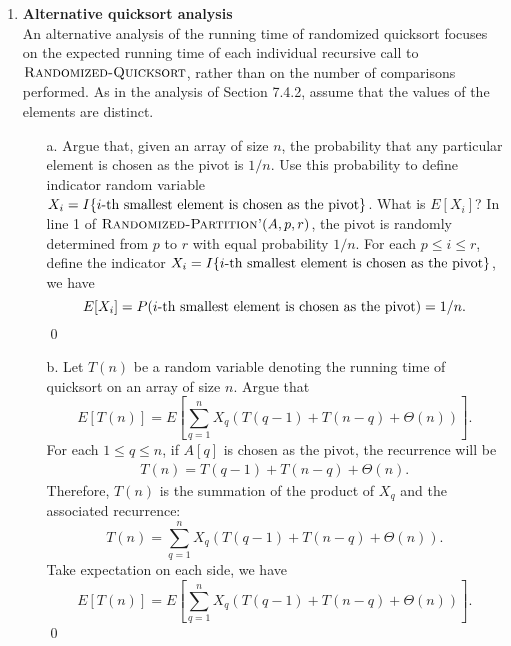 \documentclass[12pt,reqno]{amsart}
\newif\ifanswer
\begin{document}
\begin{enumerate}[1.]
\item \textbf{Alternative quicksort analysis}\\ An alternative analysis of the running time of randomized quicksort focuses on the expected running time of each individual recursive call to $\textsc{Randomized-Quicksort}$, rather than on the number of comparisons performed. As in the analysis of Section 7.4.2, assume that the values of the elements are distinct.
\begin{enumerate}
    \item[a.] Argue that, given an array of size $n$, the probability that any particular element is chosen as the pivot is $1/n$. Use this probability to define indicator random variable $X_i = I\{\textup{$i$-th smallest element is chosen as the pivot}\}$. What is $E[X_i]$?
    \ifanswer
    \noindent {\bf \\Solution}
    In line 1 of $\textsc{Randomized-Partition'}(A, p, r)$, the pivot is randomly determined from $p$ to $r$ with equal probability $1/n$. For each $p \leq i \leq r$, define the indicator $X_i = I\{\textup{$i$-th smallest element is chosen as the pivot}\}$, we have
    $$
    E[X_i] = P(\textup{$i$-th smallest element is chosen as the pivot}) = 1/n.
    $$
    \qed

    \item[b.] Let $T(n)$ be a random variable denoting the running time of quicksort on an array of size $n$. Argue that
    \begin{equation}
        E[T(n)] = E\left[\sum_{q = 1}^n{X_q\left(T(q - 1) + T(n - q) + \Theta(n)\right)}\right].
        \tag{7.2}
        \label{Equation 1 used in Problem 3}
    \end{equation}
    \ifanswer
    \noindent {\bf \\Solution}
    For each $1 \leq q \leq n$, if $A[q]$ is chosen as the pivot, the recurrence will be
    \begin{align*}
        T(n) = T(q - 1) + T(n - q) + \Theta(n).
    \end{align*}
    Therefore, $T(n)$ is the summation of the product of $X_q$ and the associated recurrence:
    $$
    T(n) = \sum_{q = 1}^n{X_q\left(T(q - 1) + T(n - q) + \Theta(n)\right)}.
    $$
    Take expectation on each side, we have
    $$
    E[T(n)] = E\left[\sum_{q = 1}^n{X_q\left(T(q - 1) + T(n - q) + \Theta(n)\right)}\right].
    $$
    \qed
    

\end{enumerate}
\end{enumerate}
\end{document}
